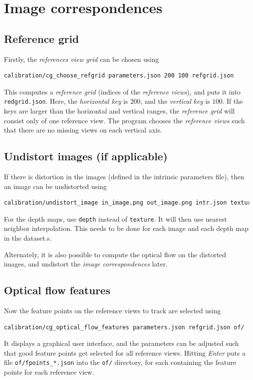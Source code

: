 \documentclass{scrreprt}
\begin{document}
\section{Image correspondences}

\subsection{Reference grid}
Firstly, the \emph{references view grid} can be chosen using
\begin{lstlisting}[language=bash]
calibration/cg_choose_refgrid parameters.json 200 100 refgrid.json
\end{lstlisting}
This computes a \emph{reference grid} (indices of the \emph{reference views}), and puts it into \texttt{redgrid.json}. Here, the \emph{horizontal key} is $200$, and the \emph{vertical key} is $100$. If the keys are larger than the horizontal and vertical ranges, the \emph{reference grid} will consist only of one reference view. The program chooses the \emph{reference views} such that there are no missing views on each vertical axis.

\subsection{Undistort images (if applicable)}
If there is distortion in the images (defined in the intrinsic parameters file), then an image can be undistorted using
\begin{lstlisting}[language=bash]
calibration/undistort_image in_image.png out_image.png intr.json texture
\end{lstlisting}
For the depth maps, use \texttt{depth} instead of \texttt{texture}. It will then use nearest neighbor interpolation. This needs to be done for each image and each depth map in the dataset.s.

Alternately, it is also possible to compute the optical flow on the distorted images, and undistort the \emph{image correspondences} later.

\subsection{Optical flow features}
Now the feature points on the reference views to track are selected using
\begin{lstlisting}[language=bash]
calibration/cg_optical_flow_features parameters.json refgrid.json of/
\end{lstlisting}
It displays a graphical user interface, and the parameters can be adjusted such that good feature points get selected for all reference views. Hitting \emph{Enter} puts a file \texttt{of/fpoints\_*.json} into the \texttt{of/} directory, for each containing the feature points for each reference view.
\end{document}
